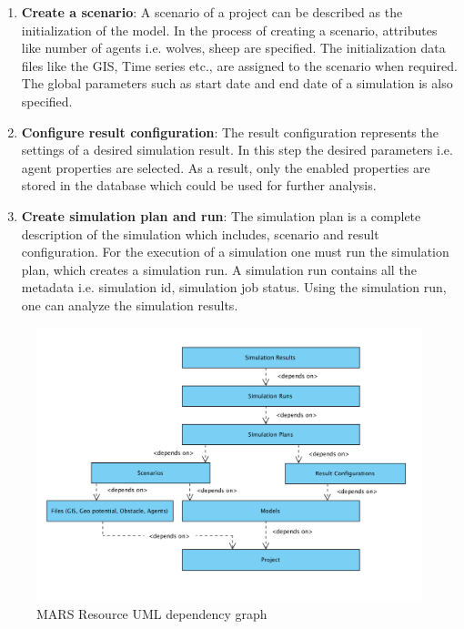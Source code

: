 \begin{enumerate}
            \item 
                \textbf{Create a scenario}: A scenario of a project can be described as the initialization of the model.
                In the process of creating a scenario, attributes like number of agents i.e. wolves, sheep are specified. 
                The initialization data files like the GIS, Time series etc., are assigned to the scenario when required. 
                The global parameters such as start date and end date of a simulation is also specified.

            \item 
                \textbf{Configure result configuration}: The result configuration represents the settings of a desired simulation result. In this step the desired parameters
                i.e. agent properties are selected. As a result, only the enabled properties are stored in the database which could be used for further analysis.

            \item  
                \textbf{Create simulation plan and run}: The simulation plan is a complete description of the
                 simulation which includes, scenario and result configuration. For the execution of a simulation
                 one must run the simulation plan, which creates
                 a simulation run. A simulation run contains all the metadata i.e. simulation id, simulation 
                 job status. Using the simulation run, one can analyze the 
                 simulation results.
        \end{enumerate} 
        
        \begin{figure}[H]
            \centering \includegraphics[scale=0.6]{grafiken/marsDependency.png}
            \caption{MARS Resource UML dependency graph}
            \label{fig:marsDependency}
        \end{figure}
        
